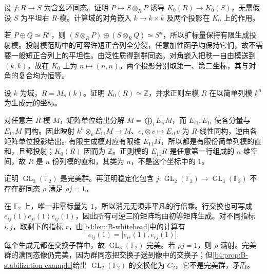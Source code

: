 \begin{exercise}\label{b4:ex:B-scalar-extension-k0}
	设 \(f:R\rightarrow S\) 为含幺环同态。证明 \(P\mapsto S\otimes_RP\) 诱导 \(K_0(R)\rightarrow K_0(S)\)，无需假设 \(S\) 为平坦右 \(R\)-模。计算域的对角嵌入 \(k\rightarrow k\times k\) 及两个投影在 \(K_0\) 上的作用。
\end{exercise}
\begin{solution}
	若 \(P\oplus Q\simeq R^n\)，则 \((S\otimes_RP)\oplus(S\otimes_RQ)\simeq S^n\)，所以扩标量保持有限生成投射模。投射模范畴中的可容许短正合列全分裂，任意加性函子均保持它们，故不需要一般短正合列上的平坦性。由泛性质得到群同态。对角嵌入把秩一自由模送到 \((k,k)\)，故在 \(K_0\) 上为 \(n\mapsto(n,n)\)。两个投影分别取第一、第二坐标，其与对角的复合均为恒等。
\end{solution}

\begin{exercise}\label{b4:ex:B-matrix-kzero}
	设 \(k\) 为域，\(R=M_n(k)\)。证明 \(K_0(R)\simeq\mathbb Z\)，并求正则左模 \(R\) 在以简单列模 \(k^n\) 为生成元的坐标。
\end{exercise}
\begin{solution}
	对任意左 \(R\)-模 \(M\)，矩阵单位给出分解 \(M=\bigoplus_iE_{ii}M\)，而 \(E_{i1},E_{1i}\) 使各分量与 \(E_{11}M\) 同构。因此映射 \(k^n\otimes_k E_{11}M\rightarrow M\)、\(e_i\otimes v\mapsto E_{i1}v\) 为 \(R\)-线性同构，逆由各矩阵单位投影给出。有限生成模对应有限维 \(E_{11}M\)，所以都是有限份简单列模的直和，且都投射；\(K_0(R)\) 因而为 \(\mathbb Z\)。正则模的 \(E_{11}R\) 是任意第一行组成的 \(n\)-维空间，故 \(R\) 是 \(n\) 份列模的直和，其类为 \(n\)，不是这个坐标中的 \(1\)。
\end{solution}

\begin{exercise}\label{b4:ex:B-small-matrix-stabilization}
	证明 \(\operatorname{GL}_3(\mathbb F_2)\) 是完美群。再证明稳定化包含 \(j:\operatorname{GL}_2(\mathbb F_2)\to\operatorname{GL}_3(\mathbb F_2)\) 不存在群同态 \(\rho\) 满足 \(\rho j=1\)。
\end{exercise}
\begin{solution}
	在 \(\mathbb F_2\) 上，唯一非零标量为 \(1\)，所以消元无须非平凡的行倍乘。行交换也可写成 \(e_{ij}(1)e_{ji}(1)e_{ij}(1)\)，因此所有可逆三阶矩阵均由初等矩阵生成。对不同指标 \(i,j\)，取剩下的指标 \(r\)，由\cref{b4:lem:B-whitehead}中的计算有
	\[
		e_{ij}(1)=\bigl[e_{ir}(1),e_{rj}(1)\bigr].
	\]
	每个生成元都在交换子群中，故 \(\operatorname{GL}_3(\mathbb F_2)\) 完美。若 \(\rho j=1\)，则 \(\rho\) 满射。完美群的满同态像仍完美，因为群同态把交换子送到像中的交换子；但\cref{b4:prop:B-stabilization-example}给出 \(\operatorname{GL}_2(\mathbb F_2)\) 的交换化为 \(C_2\)，它不是完美群，矛盾。
\end{solution}

